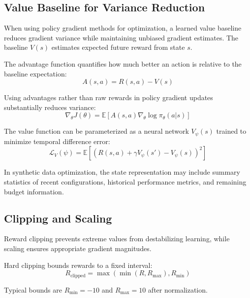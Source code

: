 \subsection{Value Baseline for Variance Reduction}

When using policy gradient methods for optimization, a learned value baseline reduces gradient variance while maintaining unbiased gradient estimates. The baseline $V(s)$ estimates expected future reward from state $s$.

The advantage function quantifies how much better an action is relative to the baseline expectation:
\begin{equation}
A(s, a) = R(s, a) - V(s)
\label{eq:advantage}
\end{equation}

Using advantages rather than raw rewards in policy gradient updates substantially reduces variance:
\begin{equation}
\nabla_\theta J(\theta) = \mathbb{E}\left[ A(s, a) \nabla_\theta \log \pi_\theta(a|s) \right]
\label{eq:advantage_gradient}
\end{equation}

The value function can be parameterized as a neural network $V_\psi(s)$ trained to minimize temporal difference error:
\begin{equation}
\mathcal{L}_V(\psi) = \mathbb{E}\left[ (R(s, a) + \gamma V_\psi(s') - V_\psi(s))^2 \right]
\label{eq:value_loss}
\end{equation}

In synthetic data optimization, the state representation may include summary statistics of recent configurations, historical performance metrics, and remaining budget information.

\subsection{Clipping and Scaling}

Reward clipping prevents extreme values from destabilizing learning, while scaling ensures appropriate gradient magnitudes.

Hard clipping bounds rewards to a fixed interval:
\begin{equation}
R_{\text{clipped}} = \max(\min(R, R_{\text{max}}), R_{\text{min}})
\label{eq:hard_clipping}
\end{equation}

Typical bounds are $R_{\text{min}} = -10$ and $R_{\text{max}} = 10$ after normalization.

